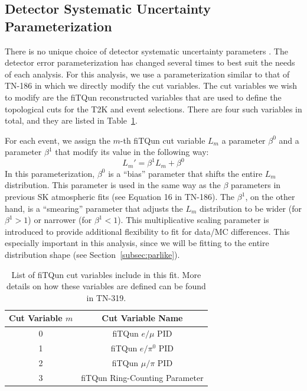 \subsection{Detector Systematic Uncertainty Parameterization}
\label{subsec:betapar}

There is no unique choice of detector systematic uncertainty parameters \ldsk.
The detector error parameterization has changed several times to best suit the
needs of each analysis. For this analysis, we use a parameterization
similar to that of TN-186 in which we directly modify the cut variables.  The
cut variables we wish to modify are the fiTQun reconstructed variables that are
used to define the topological cuts for the T2K \nue and \numu event
selections.  There are four such variables in total, and they are listed
in Table~\ref{tab:fqvars}.

For each event, we assign the $m$-th fiTQun cut variable $L_{m}$ a parameter
$\beta^{0}$ and a parameter $\beta^{1}$ that modify its value in the following
way:
%
\begin{equation}
  \label{eq:fqparmod}
  L_{m}' = \beta^{1} L_{m} + \beta^{0}
\end{equation}
%
In this parameterization, $\beta^{0}$ is a ``bias'' parameter that shifts the
entire $L_{m}$ distribution.  This parameter is used in the same way as the
$\beta$ parameters in previous SK atmospheric fits (see Equation 16 in TN-186).
The $\beta^{1}$, on the other hand, is a ``smearing'' parameter that adjusts
the $L_{m}$ distribution to be wider (for $\beta^{1} > 1$) or narrower (for
$\beta^{1} < 1$).  This multiplicative scaling parameter is introduced to
provide additional flexibility to fit for data/MC differences.  This especially
important in this analysis, since we will be fitting to the entire
distribution shape (see Section~\ref{subsec:parlike}).

\begin{table}
  \centering
  \begin{tabular}{c | c}
    \hline\hline
    Cut Variable $m$ & Cut Variable  Name \\
    \hline
    0 & fiTQun $e/\mu$ PID \\
    1 & fiTQun $e/\pi^{0}$ PID \\
    2 & fiTQun $\mu/\pi$ PID \\
    3 & fiTQun Ring-Counting Parameter \\
    \hline\hline
  \end{tabular}
  \caption{List of fiTQun cut variables include in this fit.  More details on
  how these variables are defined can be found in TN-319.}
  \label{tab:fqvars}
\end{table}


